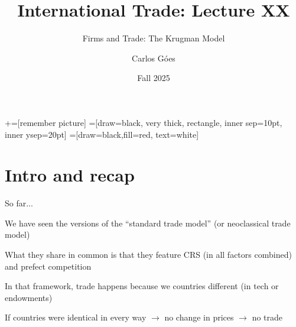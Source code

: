 \documentclass[notes,11pt, aspectratio=169, xcolor=table]{beamer}
\title[]{International Trade: Lecture XX}
\subtitle[]{Firms and Trade: The Krugman Model}
\author[Góes]
{Carlos Góes\inst{1}}
\date{Fall 2025}
\institute[GWU]{\inst{1} George Washington University }
\newenvironment{wideitemize}{\itemize\addtolength{\itemsep}{10pt}}{\enditemize}
\begin{document}
\newcommand\marktopleft[1]{%
    \tikz[overlay,remember picture] 
        \node (marker-#1-a) at (-.3em,.3em) {};%
}
\newcommand\markbottomright[2]{%
    \tikz[overlay,remember picture] 
        \node (marker-#1-b) at (0em,0em) {};%
}
+=[remember picture] 
 =[draw=black, very thick, rectangle, inner sep=10pt, inner ysep=20pt]
 =[draw=black,fill=red, text=white]















\frame{\titlepage}
\addtocounter{framenumber}{-1}

\section{Intro and recap}

\begin{frame}{So far...}
\begin{wideitemize}
    \item We have seen the versions of the ``standard trade model'' (or neoclassical trade model)
    \item What they share in common is that they feature CRS (in all factors combined) and prefect competition
    \item In that framework, trade happens because we countries different (in tech or endowments)
    \item If countries were identical in every way $\rightarrow$ no change in prices $\rightarrow$ no trade
\end{wideitemize}
\end{frame}
\end{document}
